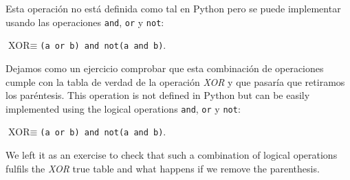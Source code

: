 \begin{paracol}{2}
Esta operación no está definida como tal en Python pero se puede implementar usando las operaciones \texttt{and}, \texttt{or} y \texttt{not}:

$\text{XOR} \equiv$\texttt{(a or b) and not(a and b)}. 

Dejamos como un ejercicio comprobar que esta combinación de operaciones cumple con la tabla de verdad de la operación \emph{XOR} y que pasaría que retiramos los paréntesis.
\switchcolumn
This operation is not defined in Python but can be easily implemented using the logical operations \texttt{and}, \texttt{or} y \texttt{not}:

$\text{XOR} \equiv$\texttt{(a or b) and not(a and b)}. 

We left it as an exercise to check that such a combination of logical operations fulfils the \emph{XOR} true table and what happens if we remove the parenthesis.    
\end{paracol}

